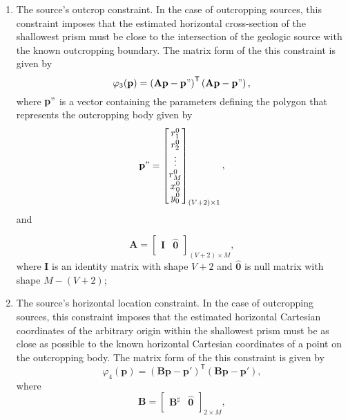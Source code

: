 \begin{enumerate}
\item The source’s outcrop constraint. In the case of outcropping sources, this constraint imposes that the estimated horizontal cross-section of the shallowest prism must be close to the intersection of the geologic source with the known outcropping boundary. The matrix form of the this constraint is given by
\begin{equation}
\varphi_{3}(\mathbf{p}) = \left(\mathbf{A}\mathbf{p} - \mathbf{p}"\right)^\mathsf{T}\left(\mathbf{A}\mathbf{p} - \mathbf{p}"\right) ,
\end{equation}
where $\mathbf{p}"$ is a vector containing the parameters defining the polygon that represents the outcropping body given by
\begin{equation}
\mathbf{p}" = 
\begin{bmatrix}
r_{1}^{0} \\
r_{2}^{0} \\
\vdots \\
r_{M}^{0} \\
x_{0}^{0} \\
y_{0}^{0}
\end{bmatrix}_{(V+2)\times 1},
\end{equation}
and

\begin{equation}
\mathbf{A} = 
\begin{bmatrix}
\mathbf{I} & \hat{\mathbf{0}} \\
\end{bmatrix}_{(V+2)\times M},
\end{equation}
where $\mathbf{I}$ is an identity matrix with shape $V+2$ and $\hat{\mathbf{0}}$ is null matrix with shape $M -(V+2)$;

\item The source's horizontal location constraint. In the case of outcropping sources, this constraint imposes that the estimated horizontal Cartesian coordinates of the arbitrary origin within the shallowest prism must be as close as possible to the known horizontal Cartesian coordinates of a point on the outcropping body. The matrix form of the this constraint is given by
\begin{equation}
\varphi_{4}(\mathbf{p}) = \left(\mathbf{B}\mathbf{p} - \mathbf{p}'\right)^\mathsf{T}\left(\mathbf{B}\mathbf{p} - \mathbf{p}'\right) ,
\end{equation}
where
\begin{equation}
\mathbf{B} = 
\begin{bmatrix}
\mathbf{B}^{\sharp} & \hat{\mathbf{0}} \\
\end{bmatrix}_{2\times M} ,
\end{equation}


\end{enumerate}
